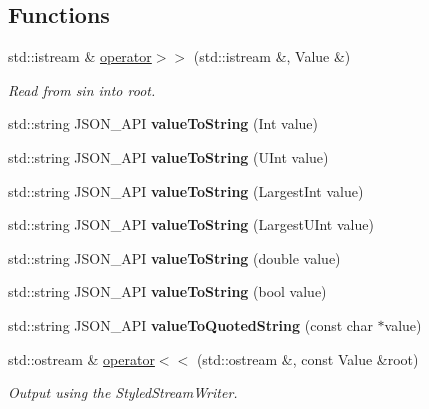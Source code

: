 \subsection*{Functions}
\begin{DoxyCompactItemize}
\item 
std\+::istream \& \hyperlink{namespace_json_a4d245ef719cc0853e8e78eb5f99c16e5}{operator$>$$>$} (std\+::istream \&, Value \&)
\begin{DoxyCompactList}\small\item\em Read from \textquotesingle{}sin\textquotesingle{} into \textquotesingle{}root\textquotesingle{}. \end{DoxyCompactList}\item 
std\+::string J\+S\+O\+N\+\_\+\+A\+PI {\bfseries value\+To\+String} (Int value)\hypertarget{namespace_json_a5d3eba6789f9a9c1ab563ff8b4a5090f}{}\label{namespace_json_a5d3eba6789f9a9c1ab563ff8b4a5090f}

\item 
std\+::string J\+S\+O\+N\+\_\+\+A\+PI {\bfseries value\+To\+String} (U\+Int value)\hypertarget{namespace_json_a4d43b0ff222bd3975bcf1babca0b978f}{}\label{namespace_json_a4d43b0ff222bd3975bcf1babca0b978f}

\item 
std\+::string J\+S\+O\+N\+\_\+\+A\+PI {\bfseries value\+To\+String} (Largest\+Int value)\hypertarget{namespace_json_abd9c650f70d9434f98f9025e2e2faf2d}{}\label{namespace_json_abd9c650f70d9434f98f9025e2e2faf2d}

\item 
std\+::string J\+S\+O\+N\+\_\+\+A\+PI {\bfseries value\+To\+String} (Largest\+U\+Int value)\hypertarget{namespace_json_a3f46b0bc62b95a9426a2da0117bdf9f0}{}\label{namespace_json_a3f46b0bc62b95a9426a2da0117bdf9f0}

\item 
std\+::string J\+S\+O\+N\+\_\+\+A\+PI {\bfseries value\+To\+String} (double value)\hypertarget{namespace_json_a99995d7dafa4f4970b349d7d3c8d1d99}{}\label{namespace_json_a99995d7dafa4f4970b349d7d3c8d1d99}

\item 
std\+::string J\+S\+O\+N\+\_\+\+A\+PI {\bfseries value\+To\+String} (bool value)\hypertarget{namespace_json_a979ed531f091985e22f0051cd2a8e341}{}\label{namespace_json_a979ed531f091985e22f0051cd2a8e341}

\item 
std\+::string J\+S\+O\+N\+\_\+\+A\+PI {\bfseries value\+To\+Quoted\+String} (const char $\ast$value)\hypertarget{namespace_json_aa0c8235a4a5c6599da5d3332743db8ac}{}\label{namespace_json_aa0c8235a4a5c6599da5d3332743db8ac}

\item 
std\+::ostream \& \hyperlink{namespace_json_a87bc83d7e90fc666d28aa16727deda2f}{operator$<$$<$} (std\+::ostream \&, const Value \&root)
\begin{DoxyCompactList}\small\item\em Output using the Styled\+Stream\+Writer. \end{DoxyCompactList}\end{DoxyCompactItemize}


